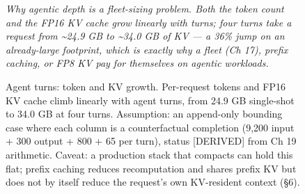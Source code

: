 \begin{figure}
\centering
{}
\caption[Agent turns: token and KV growth]{Agent turns: token and KV growth. Per-request tokens and FP16 KV cache climb linearly with agent turns, from 24.9 GB single-shot to 34.0 GB at four turns. Assumption: an append-only bounding case where each column is a counterfactual completion (9,200 input + 300 output + 800 + 65 per turn), status \mbox{{[}DERIVED{]}} from Ch 19 arithmetic. Caveat: a production stack that compacts can hold this flat; prefix caching reduces recomputation and shares prefix KV but does not by itself reduce the request's own KV-resident context (§6).}

\label{fig:19.2}\emph{Why agentic depth is a fleet-sizing problem. Both the token count
and the FP16 KV cache grow linearly with turns; four turns take a
request from \textasciitilde24.9 GB to \textasciitilde34.0 GB of KV ---
a 36\% jump on an already-large footprint, which is exactly why a fleet
(Ch 17), prefix caching, or FP8 KV pay for themselves on agentic
workloads.}


\end{figure}
